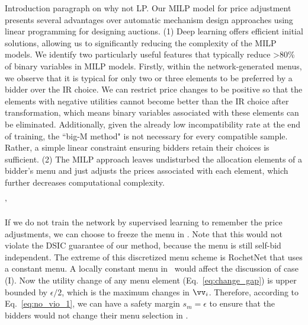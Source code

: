 Introduction paragraph on why not LP.
Our MILP model for price adjustment presents several advantages over automatic mechanism design approaches using linear programming for designing auctions. (1) Deep learning offers efficient initial solutions, allowing us to significantly reducing the complexity of the MILP models.  
%
We identify two particularly useful features that typically reduce >80\% of binary variables in MILP models. 
 Firstly, within the network-generated menus, we observe that it is typical for only
 two or three elements to be preferred by a bidder over the IR choice.  
We can restrict price changes to be positive  so that the elements with negative utilities cannot become better than the IR choice after transformation, which means binary variables associated with these elements can be eliminated. Additionally, given the already low incompatibility rate at the end of training,
 the ``big-M method" is not necessary for every compatible sample. 
%
Rather, a simple linear constraint ensuring bidders retain their choices is sufficient.  (2) The MILP approach leaves undisturbed the allocation elements of a bidder's menu and just adjusts the prices associated with each element, which  further decreases computational complexity. 



'






If we do not train the network by supervised learning to remember the price adjustments, we can choose to freeze the menu in \neighborjoint. Note that this would not violate the DSIC guarantee of our method, because the menu is still self-bid independent. The extreme of this discretized menu scheme is RochetNet that uses a constant menu. A locally constant menu in \neighborjoint~would affect the discussion of case (I). Now the utility change of any menu element (Eq.~\ref{eq:change_gap}) is upper bounded by $\epsilon/2$, which is the maximum changes in $\vv_i$. Therefore, according to Eq.~\ref{eq:no_vio_1}, we can have a safety margin $s_m=\epsilon$ to ensure that the bidders would not change their menu selection in \neighborjoint.








